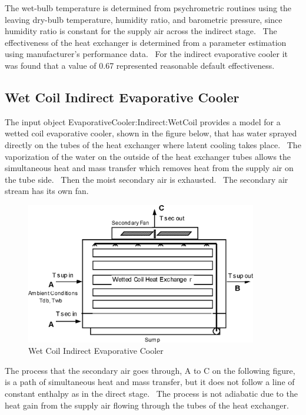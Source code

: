 The wet-bulb temperature is determined from psychrometric routines using the leaving dry-bulb temperature, humidity ratio, and barometric pressure, since humidity ratio is constant for the supply air across the indirect stage.~ The effectiveness of the heat exchanger is determined from a parameter estimation using manufacturer's performance data.~ For the indirect evaporative cooler it was found that a value of 0.67 represented reasonable default effectiveness.

\subsection{Wet Coil Indirect Evaporative Cooler}\label{wet-coil-indirect-evaporative-cooler}

The input object EvaporativeCooler:Indirect:WetCoil provides a model for a wetted coil evaporative cooler, shown in the figure below, that has water sprayed directly on the tubes of the heat exchanger where latent cooling takes place.~ The vaporization of the water on the outside of the heat exchanger tubes allows the simultaneous heat and mass transfer which removes heat from the supply air on the tube side.~ Then the moist secondary air is exhausted.~ The secondary air stream has its own fan.

\begin{figure}[hbtp] %
\centering
\includegraphics[width=0.9\textwidth, height=0.9\textheight, keepaspectratio=true]{media/image4797.png}
\caption{Wet Coil Indirect Evaporative Cooler \protect \label{fig:wet-coil-indirect-evaporative-cooler}}
\end{figure}

The process that the secondary air goes through, A to C on the following figure, is a path of simultaneous heat and mass transfer, but it does not follow a line of constant enthalpy as in the direct stage.~ The process is not adiabatic due to the heat gain from the supply air flowing through the tubes of the heat exchanger.

